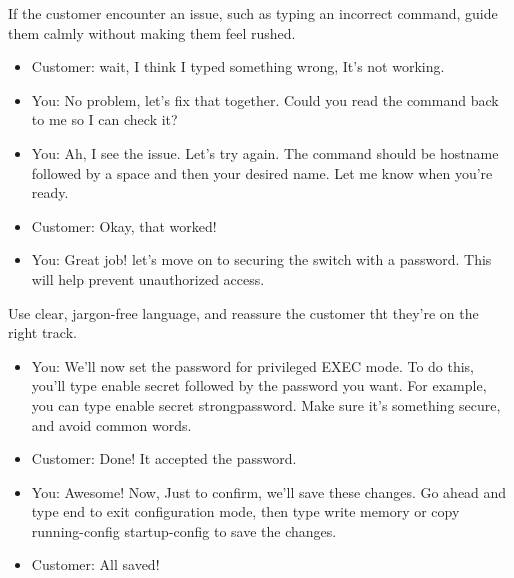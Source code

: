 \documentclass[a4paper,11pt]{article}
\begin{document}
\begin{tcolorbox}[colframe=blue!80, colback=blue!20, coltitle=black, title= Scenario:Handling Potential Issues with Patience]
     If the customer encounter an issue, such as typing an incorrect command, guide them calmly without making them feel rushed.\\
    \begin{itemize}
        \item Customer: wait, I think I typed something wrong, It's not working.\\
        \item You: No problem, let's fix that together. Could you read the command back to me so I can check it?\\
        \item You: Ah, I see the issue. Let's try again. The command should be hostname followed by a space and then your desired name. Let me know when you're ready.\\
        \item Customer: Okay, that worked!\\
        \item You: Great job! let's move on to securing the switch with a password. This will help prevent unauthorized access.\\
    \end{itemize}
\end{tcolorbox}
\begin{tcolorbox}[colframe=blue!80, colback=blue!20, coltitle=black, title= Scenario:Guiding Through Password Configuration]
      Use clear, jargon-free language, and reassure the customer tht they're on the right track.\\
    \begin{itemize}
        \item  You: We'll now set the password for privileged EXEC mode. To do this, you'll type enable secret followed by the password you want. For example, you can type enable secret strongpassword. Make sure it's something secure, and avoid common words.\\
        \item Customer: Done! It accepted the password.\\
        \item You: Awesome! Now, Just to confirm, we'll save these changes. Go ahead and type end to exit configuration mode, then type write memory or copy running-config startup-config to save the changes.\\
        \item Customer: All saved!\\
    \end{itemize}
\end{tcolorbox}
\end{document}
